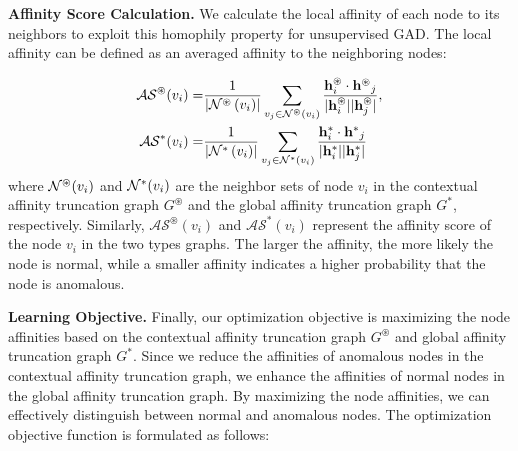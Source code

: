 \documentclass{article}
\begin{document}
\textbf{Affinity Score Calculation.} We calculate the local affinity of each node to its neighbors to exploit this homophily property for unsupervised GAD. The local affinity can be defined as an averaged affinity to the neighboring nodes:

\begin{equation}
\label{eq: affinity socre}
\begin{aligned}
\mathcal{AS}^{\circledast}({v_i}) =& \frac{1}{{\left| {{\cal N^{\circledast}}\left( {{v_i}} \right)} \right|}} \sum\limits_{{v_j} \in {\cal N^{\circledast}}\left( {{v_i}} \right)} {\frac{{\mathbf{h}_i^{\circledast} \cdot{{{\mathbf{h}^{\circledast}}}_j}}}     { |{\mathbf{h}}^{\circledast}_i |  |{\mathbf{h}^{\circledast}_j}| }},
\\   
\mathcal{AS}^{*}({v_i}) =& \frac{1}{{\left| {{\cal N^{*}}\left( {{v_i}} \right)} \right|}}\sum\limits_{{v_j} \in {\cal N^{*}}\left( {{v_i}} \right)} {\frac{{\mathbf{h}_i^{*} \cdot{{{\mathbf{h}^{*}}}_j}}}     { |{\mathbf{h}}^{*}_i |  |{\mathbf{h}^{*}_j}| }}
\end{aligned}
\end{equation}
where ${\cal N^{\circledast}}({v_i})$ and ${\cal N^{*}}({v_i})$ are the neighbor sets of node $v_i$ in the contextual affinity truncation graph $G^{\circledast}$ and the global affinity truncation graph $G^{*}$, respectively. Similarly, $\mathcal{AS}^{\circledast}({v_i}) $ and $\mathcal{AS}^{*}({v_i})$ represent the affinity score of the node $v_i$ in the two types graphs. The larger the affinity, the more likely the node is normal, while a smaller affinity indicates a higher probability that the node is anomalous.

\textbf{Learning Objective.} Finally, our optimization objective is maximizing the node affinities based on the contextual affinity truncation graph $G^{\circledast}$ and global affinity truncation graph $G^{*}$. Since we reduce the affinities of anomalous nodes in the contextual affinity truncation graph, we enhance the affinities of normal nodes in the global affinity truncation graph. By maximizing the node affinities, we can effectively distinguish between normal and anomalous nodes. The optimization objective function is formulated as follows:
\end{document}
